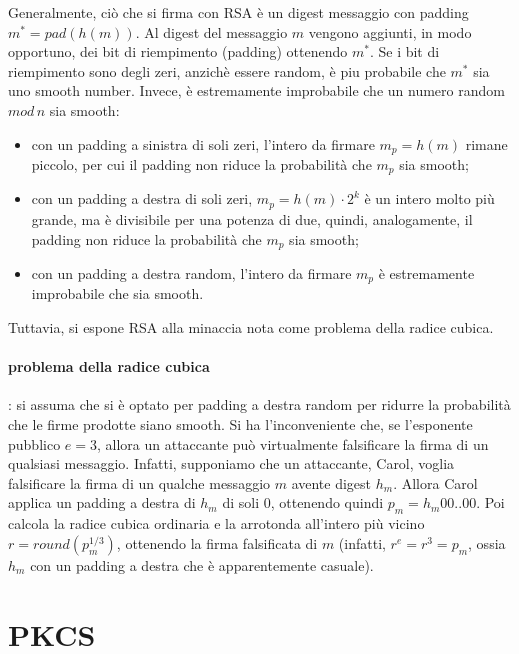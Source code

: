 Generalmente, ciò che si firma con RSA è un digest messaggio con padding $m^{*} = pad(h(m))$. Al digest del messaggio $m$ vengono aggiunti, in modo opportuno, dei bit di riempimento (padding) ottenendo $m^*$. Se i bit di riempimento sono degli zeri, anzichè essere random, è piu probabile che $m^*$ sia uno smooth number. Invece, è estremamente improbabile che un numero random $mod \, n$ sia smooth: \begin{itemize}
\item con un padding a sinistra di soli zeri, l'intero da firmare $m_{p} = h(m)$ rimane piccolo, per cui il padding non riduce la probabilità che $m_{p}$ sia smooth;
\item con un padding a destra di soli zeri, $m_{p} = h(m) \cdot 2^k $ è un intero molto più grande, ma è divisibile per una potenza di due, quindi, analogamente, il padding non riduce la probabilità che $m_{p}$ sia smooth;
\item con un padding a destra random, l'intero da firmare $m_{p}$ è estremamente improbabile che sia smooth. 
\end{itemize}
Tuttavia, si espone RSA alla minaccia nota come problema della radice cubica.

\paragraph{problema della radice cubica}: si assuma che si è optato per padding a destra random per ridurre la probabilità che le firme prodotte siano smooth. Si ha l'inconveniente che, se l'esponente pubblico $e = 3$, allora un attaccante può virtualmente falsificare la firma di un qualsiasi messaggio. Infatti, supponiamo che un attaccante, Carol, voglia falsificare la firma di un qualche messaggio $m$ avente digest $h_{m}$. Allora Carol applica un padding a destra di $h_{m}$ di soli 0, ottenendo quindi $p_{m} = h_{m}00..00$. Poi calcola la radice cubica ordinaria e la arrotonda all'intero più vicino $r = round(p_{m}^{1/3})$, ottenendo la firma falsificata di $m$ (infatti, $r^e = r^3 = p_{m}$, ossia $h_{m}$ con un padding a destra che è apparentemente casuale).

\section{PKCS}

